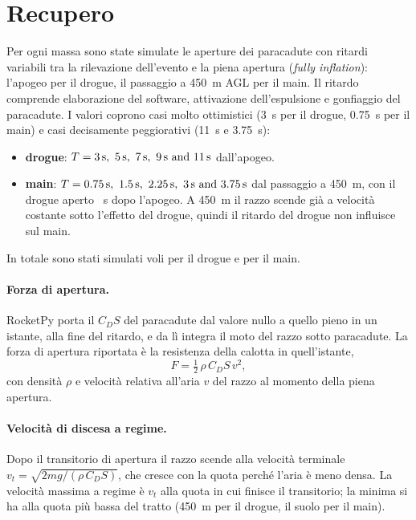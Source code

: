 \documentclass[11pt,a4paper]{article}
\begin{document}
\FloatBarrier
\newpage
\section{Recupero}
Per ogni massa sono state simulate le aperture dei paracadute con ritardi variabili tra la rilevazione
dell'evento e la piena apertura (\emph{fully inflation}): l'apogeo per il drogue, il passaggio a
\SI{450}{m} AGL per il main. Il ritardo comprende elaborazione del software, attivazione dell'espulsione e
gonfiaggio del paracadute. I valori coprono casi molto ottimistici (\SI{3}{s} per il drogue, \SI{0.75}{s} per il
main) e casi decisamente peggiorativi (\SI{11}{s} e \SI{3.75}{s}):
\begin{itemize}
  \item \textbf{drogue}: $T = \SIlist{3;5;7;9;11}{s}$ dall'apogeo.
  \item \textbf{main}: $T = \SIlist{0.75;1.5;2.25;3;3.75}{s}$ dal passaggio a \SI{450}{m}, con il drogue
        aperto \MainFixedDrogueDelay~s dopo l'apogeo. A \SI{450}{m} il razzo scende già a velocità costante
        sotto l'effetto del drogue, quindi il ritardo del drogue non influisce sul main.
\end{itemize}
In totale sono stati simulati \NFlightsDrogue{} voli per il drogue e \NFlightsMain{} per il main.

\paragraph{Forza di apertura.} RocketPy porta il $C_D S$ del paracadute dal valore nullo a quello pieno in un
istante, alla fine del ritardo, e da lì integra il moto del razzo sotto paracadute. La forza di apertura
riportata è la resistenza della calotta in quell'istante,
\begin{equation*}
  F = \tfrac{1}{2}\,\rho\,C_D S\,v^2,
\end{equation*}
con densità $\rho$ e velocità relativa all'aria $v$ del razzo al momento della piena apertura.

\paragraph{Velocità di discesa a regime.} Dopo il transitorio di apertura il razzo scende alla velocità
terminale $v_t = \sqrt{2mg/(\rho\, C_D S)}$, che cresce con la quota perché l'aria è meno densa. La velocità
massima a regime è $v_t$ alla quota in cui finisce il transitorio; la minima si ha alla quota più bassa del
tratto (\SI{450}{m} per il drogue, il suolo per il main).
\newpage
\end{document}
